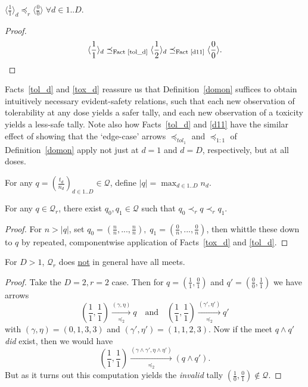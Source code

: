 \documentclass{article}
\newcommand{\Q}{\ensuremath{\mathcal{Q}}}
\begin{document}
\begin{fact}\label{tox_d}
  $\langle\frac{1}{1}\rangle_d \preceq_r \langle\frac{0}{0}\rangle \;\forall d\in 1..D$.
\end{fact}
\begin{proof}
  $$
  \langle\frac{1}{1}\rangle_d \preceq_\text{Fact~\ref{tol_d}} \langle\frac{1}{2}\rangle_d \preceq_\text{Fact~\ref{d11}} \langle\frac{0}{0}\rangle.
  $$
\end{proof}

Facts~\ref{tol_d} and \ref{tox_d} reassure us that Definition~\ref{domon} suffices to obtain intuitively necessary evident-safety relations, such that each new observation of tolerability at any dose yields a safer tally, and each new observation of a toxicity yields a less-safe tally.  Note also how Facts~\ref{tol_d} and \ref{d11} have the similar effect of showing that the `edge-case' arrows $\preceq_{tol_1}$ and $\preceq_{1:1}$ of Definition~\ref{domon} apply not just at $d=1$ and $d=D$, respectively, but at all doses.

\begin{nota}
  For any $q = (\frac{t_d}{n_d})_{d\in 1..D} \in \Q$, define $|q| = \max_{d\in 1..D} n_d$.
\end{nota}

\begin{lemma}
  For any $q \in \Q_r$, there exist $q_0, q_1 \in \Q$ such that $q_0 \prec_r q \prec_r q_1$.
\end{lemma}
\begin{proof}
  For $n > |q|$, set $q_0 = (\frac{n}{n},...,\frac{n}{n}),\;q_1 = (\frac{0}{n},...,\frac{0}{n})$, then whittle these down to $q$ by repeated, componentwise application of Facts~\ref{tox_d} and \ref{tol_d}.
\end{proof}

\begin{fact}
  For $D>1$, $\Q_r$ does \underline{not} in general have all meets.
\end{fact}
\begin{proof}
  Take the $D=2, r=2$ case.  Then for $q = (\frac{1}{1},\frac{0}{1})$ and $q' = (\frac{0}{0},\frac{1}{1})$ we have arrows
  $$
  (\frac{1}{1},\frac{1}{1}) \xrightarrow[\preceq_2]{(\gamma,\eta)} q
  \quad \text{and} \quad
  (\frac{1}{1},\frac{1}{1}) \xrightarrow[\preceq_2]{(\gamma',\eta')} q'
  $$
  with $(\gamma,\eta) = (0,1,3,3)$ and $(\gamma',\eta') = (1,1,2,3)$.  Now if the meet $q \wedge q'$ {\em did} exist, then we would have
  $$
  (\frac{1}{1},\frac{1}{1}) \xrightarrow[\preceq_2]{(\gamma\wedge\gamma',\eta\wedge\eta')} (q \wedge q').
  $$
  But as it turns out this computation yields the {\em invalid} tally $(\frac{1}{0},\frac{0}{1}) \notin \Q$.
\end{proof}
\end{document}
